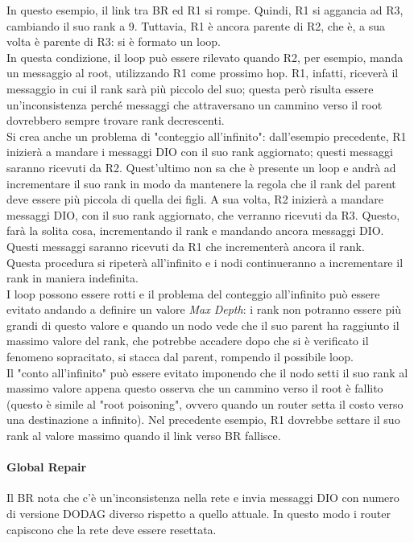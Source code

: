 \documentclass{article}
\begin{document}
\noindent In questo esempio, il link tra BR ed R1 si rompe. Quindi, R1 si aggancia ad R3, cambiando il suo rank a 9. Tuttavia, R1 è ancora parente di R2, che è, a sua volta è parente di R3: si è formato un loop. \\ In questa condizione, il loop può essere rilevato quando R2, per esempio, manda un messaggio al root, utilizzando R1 come prossimo hop. R1, infatti, riceverà il messaggio in cui il rank sarà più piccolo del suo; questa però risulta essere un'inconsistenza perché messaggi che attraversano un cammino verso il root dovrebbero sempre trovare rank decrescenti. \\ Si crea anche un problema di "conteggio all'infinito": dall'esempio precedente, R1 inizierà a mandare i messaggi DIO con il suo rank aggiornato; questi messaggi saranno ricevuti da R2. Quest'ultimo non sa che è presente un loop e andrà ad incrementare il suo rank in modo da mantenere la regola che il rank del parent deve essere più piccola di quella dei figli. A sua volta, R2 inizierà a mandare messaggi DIO, con il suo rank aggiornato, che verranno ricevuti da R3. Questo, farà la solita cosa, incrementando il rank e mandando ancora messaggi DIO. Questi messaggi saranno ricevuti da R1 che incrementerà ancora il rank. \\ Questa procedura si ripeterà all'infinito e i nodi continueranno a incrementare il rank in maniera indefinita. \\ I loop possono essere rotti e il problema del conteggio all'infinito può essere evitato andando a definire un valore \textit{Max Depth}: i rank non potranno essere più grandi di questo valore e quando un nodo vede che il suo parent ha raggiunto il massimo valore del rank, che potrebbe accadere dopo che si è verificato il fenomeno sopracitato, si stacca dal parent, rompendo il possibile loop. \\ Il "conto all'infinito" può essere evitato imponendo che il nodo setti il suo rank al massimo valore appena questo osserva che un cammino verso il root è fallito (questo è simile al "root poisoning", ovvero quando un router setta il costo verso una destinazione a infinito). Nel precedente esempio, R1 dovrebbe settare il suo rank al valore massimo quando il link verso BR fallisce.\\
\paragraph{Global Repair} Il BR nota che c'è un'inconsistenza nella rete e invia messaggi DIO con numero di versione DODAG diverso rispetto a quello attuale. In questo modo i router capiscono che la rete deve essere resettata.
\end{document}
